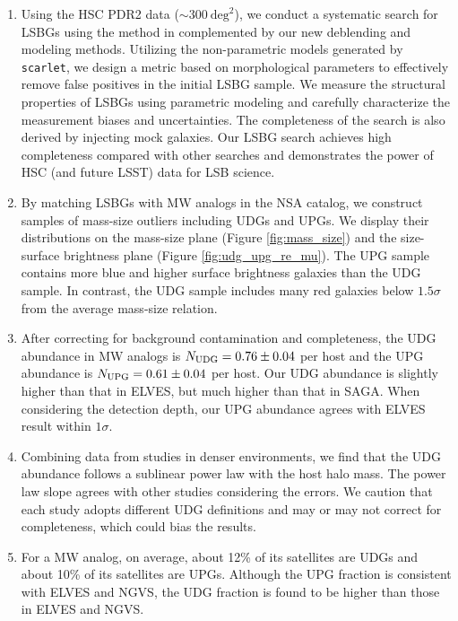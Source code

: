 \documentclass[twocolumn,astrosymb,twocolappendix]{aastex631}
\newcommand{\code}[1]{\texttt{#1}}
\begin{document}
\begin{CJK*}{UTF8}{gbsn}
\begin{enumerate}
    \item Using the HSC PDR2 data ($\sim 300\ \mathrm{deg}^{2}$), we conduct a systematic search for LSBGs using the method in \citet{Greco2018} complemented by our new deblending and modeling methods. Utilizing the non-parametric models generated by \code{scarlet}, we design a metric based on morphological parameters to effectively remove false positives in the initial LSBG sample. We measure the structural properties of LSBGs using parametric modeling and carefully characterize the measurement biases and uncertainties. The completeness of the search is also derived by injecting mock galaxies. Our LSBG search achieves high completeness compared with other searches and demonstrates the power of HSC (and future LSST) data for LSB science. 
    
    \item By matching LSBGs with MW analogs in the NSA catalog, we construct samples of mass-size outliers including UDGs and UPGs. We display their distributions on the mass-size plane (Figure \ref{fig:mass_size}) and the size-surface brightness plane (Figure \ref{fig:udg_upg_re_mu}). The UPG sample contains more blue and higher surface brightness galaxies than the UDG sample. In contrast, the UDG sample includes many red galaxies below $1.5\sigma$ from the average mass-size relation.
    
    \item After correcting for background contamination and completeness, the UDG abundance in MW analogs is $N_{\rm UDG} = 0.76\pm 0.04$ per host and the UPG abundance is $N_{\rm UPG} = 0.61 \pm 0.04$ per host. Our UDG abundance is slightly higher than that in ELVES, but much higher than that in SAGA. When considering the detection depth, our UPG abundance agrees with ELVES result within $1\sigma$. 
    
    \item Combining data from studies in denser environments, we find that the UDG abundance follows a sublinear power law with the host halo mass. The power law slope agrees with other studies considering the errors. We caution that each study adopts different UDG definitions and may or may not correct for completeness, which could bias the results.
    
    \item For a MW analog, on average, about 12\% of its satellites are UDGs and about 10\% of its satellites are UPGs. Although the UPG fraction is consistent with ELVES and NGVS, the UDG fraction is found to be higher than those in ELVES and NGVS.
    

\end{enumerate}
\end{CJK*}
\end{document}
